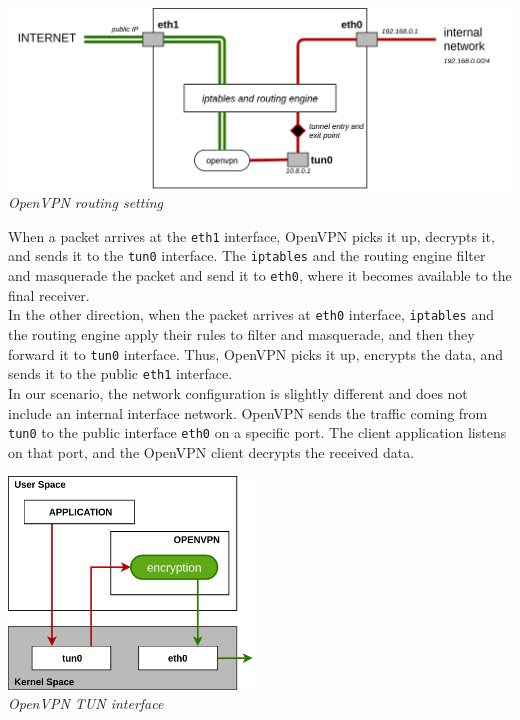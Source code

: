 \documentclass[12pt]{article}
\begin{document}
	\bigbreak
	\begin{center}
		\includegraphics[width=1\textwidth]{images/openvpn_routing_setup.png}\\
		\small{\textit{OpenVPN routing setting}}
	\end{center}
	\bigbreak
	When a packet arrives at the \lstinline{eth1} interface, OpenVPN picks it up, decrypts it, and sends it to the \lstinline{tun0} interface. The \lstinline{iptables} and the routing engine filter and masquerade the packet and send it to \lstinline{eth0}, where it becomes available to the final receiver.\\
	In the other direction, when the packet arrives at \lstinline{eth0} interface, \lstinline{iptables} and the routing engine apply their rules to filter and masquerade, and then they forward it to \lstinline{tun0} interface. Thus, OpenVPN picks it up, encrypts the data, and sends it to the public \lstinline{eth1} interface.\\
	In our scenario, the network configuration is slightly different and does not include an internal interface network. OpenVPN sends the traffic coming from \lstinline{tun0} to the public interface \lstinline{eth0} on a specific port. The client application listens on that port, and the OpenVPN client decrypts the received data.\\
	\bigbreak

	\begin{center}
		\includegraphics[width=0.5\textwidth]{images/openvpn_tun_interface.png}\\
		\small{\textit{OpenVPN TUN interface}}
	\end{center}
\end{document}
